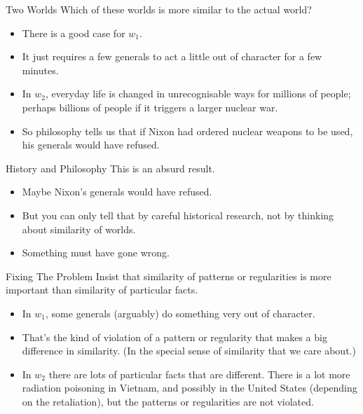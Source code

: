 \documentclass[
  ignorenonframetext,
]{beamer}
\providecommand{\tightlist}{%
  \setlength{\itemsep}{0pt}\setlength{\parskip}{0pt}}
\renewcommand{\,}{\text{, }}
\begin{document}
\begin{frame}{Two Worlds}
\protect\hypertarget{two-worlds-1}{}
Which of these worlds is more similar to the actual world? \pause 

\begin{itemize}
\tightlist
\item
  There is a good case for \(w_1\).
\item
  It just requires a few generals to act a little out of character for a
  few minutes.
\item
  In \(w_2\), everyday life is changed in unrecognisable ways for
  millions of people; perhaps billions of people if it triggers a larger
  nuclear war.
\item
  So philosophy tells us that if Nixon had ordered nuclear weapons to be
  used, his generals would have refused.
\end{itemize}
\end{frame}

\begin{frame}{History and Philosophy}
\protect\hypertarget{history-and-philosophy}{}
This is an absurd result.

\begin{itemize}
\tightlist
\item
  Maybe Nixon's generals would have refused.
\item
  But you can only tell that by careful historical research, not by
  thinking about similarity of worlds.
\item
  Something must have gone wrong.
\end{itemize}
\end{frame}

\begin{frame}{Fixing The Problem}
\protect\hypertarget{fixing-the-problem}{}
Insist that similarity of patterns or regularities is more important
than similarity of particular facts.

\begin{itemize}
\tightlist
\item
  In \(w_1\), some generals (arguably) do something very out of
  character.
\item
  That's the kind of violation of a pattern or regularity that makes a
  big difference in similarity. (In the special sense of similarity that
  we care about.)
\item
  In \(w_2\) there are lots of particular facts that are different.
  There is a lot more radiation poisoning in Vietnam, and possibly in
  the United States (depending on the retaliation), but the patterns or
  regularities are not violated.
\end{itemize}
\end{frame}
\end{document}
